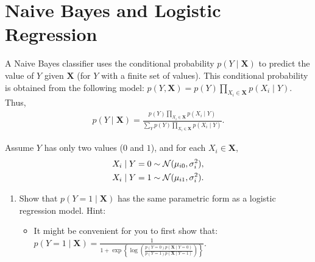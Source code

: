 \documentclass[11pt]{article}
\renewcommand{\vec}[1]{\mathbf{#1}}
\begin{document}
\pagebreak
\section{Naive Bayes and Logistic Regression}

A Naive Bayes classifier uses the conditional probability $p(Y \mid \vec{X})$ to predict the value of $Y$ given $\vec{X}$ (for $Y$ with a finite set of values).
This conditional probability is obtained from the following model: $p(Y, \vec{X}) = p(Y) \prod_{X_i \in \vec{X}} p(X_i \mid Y)$.
Thus,
\begin{align*}
p(Y \mid \vec{X}) =
\frac{
p(Y) \prod_{X_i \in \vec{X}} p(X_i \mid Y)
}{
\sum_Y p(Y) \prod_{X_i \in \vec{X}} p(X_i \mid Y)
}.
\end{align*}

Assume $Y$ has only two values ($0$ and $1$), and for each $X_i \in \vec{X}$,
\begin{align*}
X_i \mid Y=0 &\sim {\cal N}(\mu_{i0}, \sigma_i^2),\\
X_i \mid Y=1 &\sim {\cal N}(\mu_{i1}, \sigma_i^2).
\end{align*}

\begin{enumerate}
\item Show that $p(Y = 1 \mid \vec{X})$ has the same parametric form as a logistic regression model.
Hint:
\begin{itemize}
\item It might be convenient for you to first show that:
$p(Y = 1 \mid \vec{X}) = \frac{1}{1 + \exp\left\{ \log \left( \frac{ p(Y=0) p(\vec{X} \mid Y=0) }{ p(Y=1) p(\vec{X} \mid Y=1) } \right) \right\}}$.
\end{itemize}

\begin{answertext}{10cm}{}
\end{answertext}
\end{enumerate}
\end{document}
